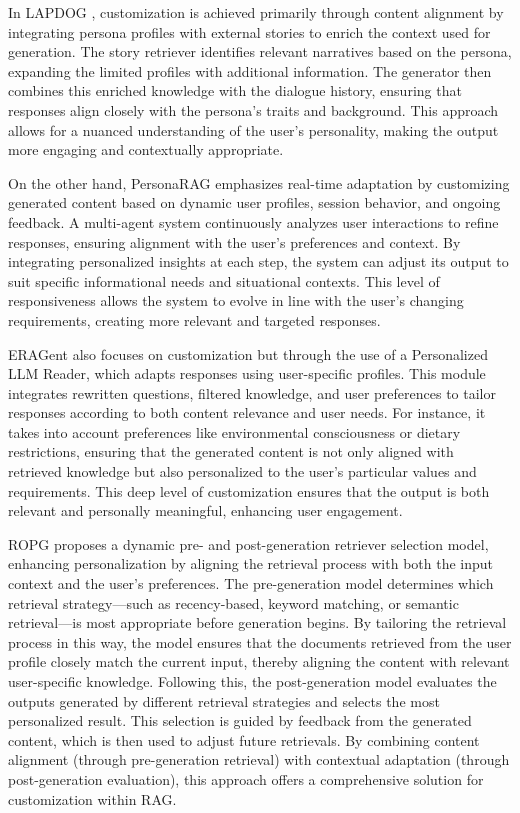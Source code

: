 In LAPDOG \cite{huang2023learning}, customization is achieved primarily through content alignment by integrating persona profiles with external stories to enrich the context used for generation. The story retriever identifies relevant narratives based on the persona, expanding the limited profiles with additional information. The generator then combines this enriched knowledge with the dialogue history, ensuring that responses align closely with the persona’s traits and background. This approach allows for a nuanced understanding of the user’s personality, making the output more engaging and contextually appropriate.

On the other hand, PersonaRAG \cite{zerhoudi2024personarag} emphasizes real-time adaptation by customizing generated content based on dynamic user profiles, session behavior, and ongoing feedback. A multi-agent system continuously analyzes user interactions to refine responses, ensuring alignment with the user’s preferences and context. By integrating personalized insights at each step, the system can adjust its output to suit specific informational needs and situational contexts. This level of responsiveness allows the system to evolve in line with the user’s changing requirements, creating more relevant and targeted responses.

ERAGent \cite{shi2024eragent} also focuses on customization but through the use of a Personalized LLM Reader, which adapts responses using user-specific profiles. This module integrates rewritten questions, filtered knowledge, and user preferences to tailor responses according to both content relevance and user needs. For instance, it takes into account preferences like environmental consciousness or dietary restrictions, ensuring that the generated content is not only aligned with retrieved knowledge but also personalized to the user’s particular values and requirements. This deep level of customization ensures that the output is both relevant and personally meaningful, enhancing user engagement.

ROPG \cite{salemi2024optimization} proposes a dynamic pre- and post-generation retriever selection model, enhancing personalization by aligning the retrieval process with both the input context and the user’s preferences. The pre-generation model determines which retrieval strategy—such as recency-based, keyword matching, or semantic retrieval—is most appropriate before generation begins. By tailoring the retrieval process in this way, the model ensures that the documents retrieved from the user profile closely match the current input, thereby aligning the content with relevant user-specific knowledge. Following this, the post-generation model evaluates the outputs generated by different retrieval strategies and selects the most personalized result. This selection is guided by feedback from the generated content, which is then used to adjust future retrievals. By combining content alignment (through pre-generation retrieval) with contextual adaptation (through post-generation evaluation), this approach offers a comprehensive solution for customization within RAG.